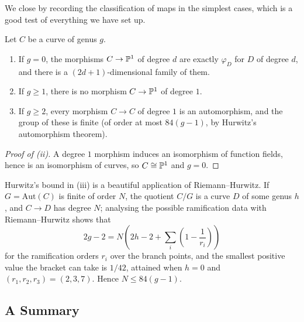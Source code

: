 \documentclass[a4paper]{scrartcl}
\begin{document}
We close by recording the classification of maps in the simplest cases, which is a good test of everything we have set up.

\begin{proposition}
	Let $C$ be a curve of genus $g$.
	\begin{enumerate}[label=(\roman*)]
		\item If $g = 0$, the morphisms $C \to \mathbb{P}^1$ of degree $d$ are exactly $\varphi_D$ for $D$ of degree $d$, and there is a $(2d+1)$-dimensional family of them.
		\item If $g \geq 1$, there is no morphism $C \to \mathbb{P}^1$ of degree $1$.
		\item If $g\geq 2$, every morphism $C\to C$ of degree $1$ is an automorphism, and the group of these is finite (of order at most $84(g-1)$, by Hurwitz's automorphism theorem).
	\end{enumerate}
\end{proposition}

\begin{proof}[Proof of (ii)]
	A degree $1$ morphism induces an isomorphism of function fields, hence is an isomorphism of curves, so $C\cong\mathbb{P}^1$ and $g = 0$.
\end{proof}

\begin{remark}
	Hurwitz's bound in (iii) is a beautiful application of Riemann--Hurwitz. If $G = \mathrm{Aut}(C)$ is finite of order $N$, the quotient $C/G$ is a curve $D$ of some genus $h$, and $C \to D$ has degree $N$; analysing the possible ramification data with Riemann--Hurwitz shows that
	$$2g-2 = N\left(2h - 2 + \sum_{i}\left(1 - \frac{1}{r_i}\right)\right)$$
	for the ramification orders $r_i$ over the branch points, and the smallest positive value the bracket can take is $1/42$, attained when $h = 0$ and $(r_1,r_2,r_3) = (2,3,7)$. Hence $N \leq 84(g-1)$.
\end{remark}

\subsection{A Summary}
\end{document}
